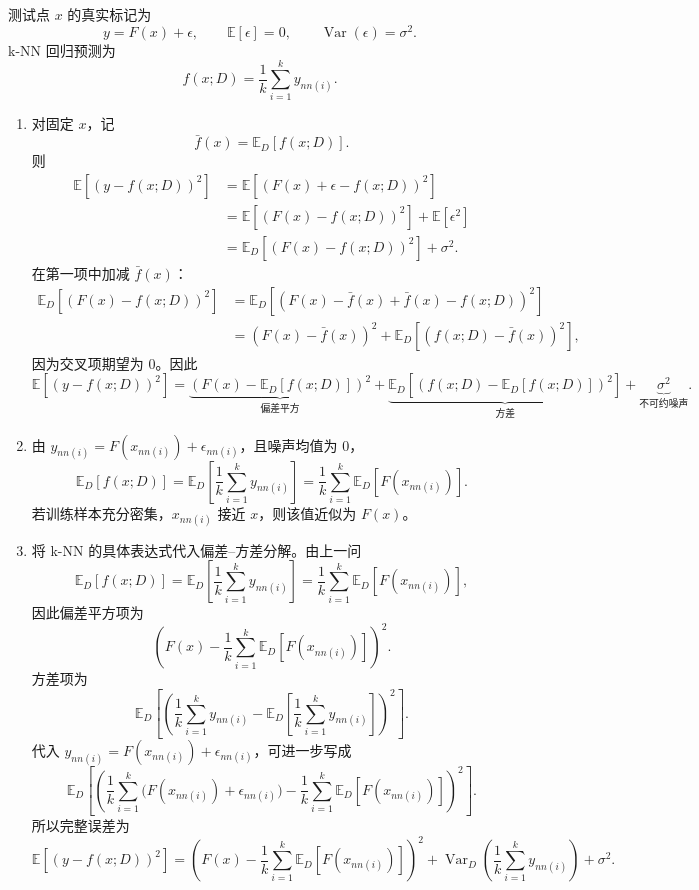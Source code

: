 \documentclass[UTF8,a4paper,12pt]{ctexart}
\newcommand{\E}{\mathbb{E}}
\newcommand{\Var}{\operatorname{Var}}
\begin{document}
测试点 $x$ 的真实标记为
\[
    y=F(x)+\epsilon,\qquad \E[\epsilon]=0,\qquad \Var(\epsilon)=\sigma^2.
\]
k-NN 回归预测为
\[
    f(x;D)=\frac{1}{k}\sum_{i=1}^k y_{nn(i)}.
\]

\begin{enumerate}
  \item 对固定 $x$，记
  \[
      \bar f(x)=\E_D[f(x;D)].
  \]
  则
  \begin{align*}
      \E[(y-f(x;D))^2]
      &=\E[(F(x)+\epsilon-f(x;D))^2]\\
      &=\E[(F(x)-f(x;D))^2]+\E[\epsilon^2]\\
      &=\E_D[(F(x)-f(x;D))^2]+\sigma^2.
  \end{align*}
  在第一项中加减 $\bar f(x)$：
  \begin{align*}
      \E_D[(F(x)-f(x;D))^2]
      &=\E_D[(F(x)-\bar f(x)+\bar f(x)-f(x;D))^2]\\
      &=(F(x)-\bar f(x))^2+\E_D[(f(x;D)-\bar f(x))^2],
  \end{align*}
  因为交叉项期望为 $0$。因此
  \[
      \E[(y-f(x;D))^2]
      =
      \underbrace{(F(x)-\E_D[f(x;D)])^2}_{\text{偏差平方}}
      +
      \underbrace{\E_D[(f(x;D)-\E_D[f(x;D)])^2]}_{\text{方差}}
      +
      \underbrace{\sigma^2}_{\text{不可约噪声}}.
  \]

  \item 由 $y_{nn(i)}=F(x_{nn(i)})+\epsilon_{nn(i)}$，且噪声均值为 $0$，
  \[
      \E_D[f(x;D)]
      =
      \E_D\left[\frac{1}{k}\sum_{i=1}^k y_{nn(i)}\right]
      =
      \frac{1}{k}\sum_{i=1}^k \E_D[F(x_{nn(i)})].
  \]
  若训练样本充分密集，$x_{nn(i)}$ 接近 $x$，则该值近似为 $F(x)$。

  \item 将 k-NN 的具体表达式代入偏差--方差分解。由上一问
  \[
      \E_D[f(x;D)]
      =
      \E_D\left[\frac{1}{k}\sum_{i=1}^k y_{nn(i)}\right]
      =
      \frac{1}{k}\sum_{i=1}^k \E_D[F(x_{nn(i)})],
  \]
  因此偏差平方项为
  \[
      \left(
      F(x)-
      \frac{1}{k}\sum_{i=1}^k \E_D[F(x_{nn(i)})]
      \right)^2.
  \]
  方差项为
  \[
      \E_D\left[
      \left(
      \frac{1}{k}\sum_{i=1}^k y_{nn(i)}
      -
      \E_D\left[\frac{1}{k}\sum_{i=1}^k y_{nn(i)}\right]
      \right)^2
      \right].
  \]
  代入 $y_{nn(i)}=F(x_{nn(i)})+\epsilon_{nn(i)}$，可进一步写成
  \[
      \E_D\left[
      \left(
      \frac{1}{k}\sum_{i=1}^k
      \bigl(F(x_{nn(i)})+\epsilon_{nn(i)}\bigr)
      -
      \frac{1}{k}\sum_{i=1}^k \E_D[F(x_{nn(i)})]
      \right)^2
      \right].
  \]
  所以完整误差为
  \[
      \E[(y-f(x;D))^2]
      =
      \left(
      F(x)-
      \frac{1}{k}\sum_{i=1}^k \E_D[F(x_{nn(i)})]
      \right)^2
      +\Var_D\!\left(
      \frac{1}{k}\sum_{i=1}^k y_{nn(i)}
      \right)
      +\sigma^2.
  \]


\end{enumerate}
\end{document}
